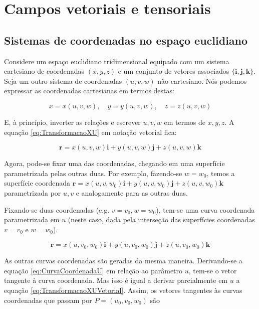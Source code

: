 \chapter{Campos vetoriais e tensoriais}\label{cap:CamposVetoriaisETensoriais}
\section{Sistemas de coordenadas no espaço euclidiano}\label{sec:SistemasCoordenadasEspacoEuclidiano}
Considere um espaço euclidiano tridimensional equipado com um sistema cartesiano de coordenadas $ (x,y,z) $ e um conjunto de vetores associados $ \{\mathbf{i}, \mathbf{j}, \mathbf{k}\} $. Seja um outro sistema de coordenadas $ (u,v,w) $ não-cartesiano. Nós podemos expressar as coordenadas cartesianas em termos destas:

\begin{equation}\label{eq:TransformacaoXU}
	x=x(u, v, w), \quad y=y(u, v, w), \quad z=z(u, v, w)
\end{equation}
	
E, à princípio, inverter as relações e escrever $ u,v,w $ em termos de $ x,y,z $. A equação \eqref{eq:TransformacaoXU} em notação vetorial fica:

\begin{equation}\label{eq:TransformacaoXUVetorial}
\mathbf{r}=x(u, v, w) \mathbf{i}+y(u, v, w) \mathbf{j}+z(u, v, w) \mathbf{k}
\end{equation}

Agora, pode-se fixar uma das coordenadas, chegando em uma superfície parametrizada pelas outras duas. Por exemplo, fazendo-se $ w=w_0 $, temos a superfície coordenada $ \mathbf{r}=x\left(u, v, w_{0}\right) \mathbf{i}+y\left(u, v, w_{0}\right) \mathbf{j}+z\left(u, v, w_{0}\right) \mathbf{k} $ parametrizada por $ u,v $ e analogamente para as outras duas.

Fixando-se duas coordenadas (e.g. $ v=v_0,w=w_0 $), tem-se uma curva coordenada parametrizada em $ u $ (neste caso, dada pela interseção das superfícies coordenadas $ v=v_0 $ e $ w=w_0 $).

\begin{equation}\label{eq:CurvaCoordenadaU}
 \mathbf{r}=x\left(u, v_{0}, w_{0}\right) \mathbf{i}+y\left(u, v_{0}, w_{0}\right) \mathbf{j}+z\left(u, v_{0}, w_{0}\right) \mathbf{k} 
\end{equation}

As outras curvas coordenadas são geradas da mesma maneira. Derivando-se a equação \eqref{eq:CurvaCoordenadaU} em relação ao parâmetro $ u $, tem-se o vetor tangente à curva coordenada. Mas isso é igual a derivar parcialmente em $ u $ a equação \eqref{eq:TransformacaoXUVetorial}. Assim, os vetores tangentes às curvas coordenadas que passam por $ P=(u_0,v_0,w_0) $ são


